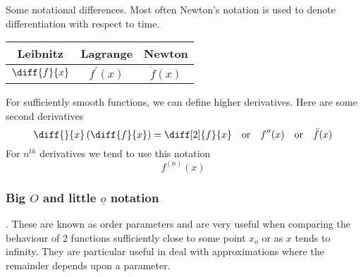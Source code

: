 \documentclass{article}
\begin{document}
Some notational differences. Most often Newton's notation is used to denote differentiation with respect to time. 
\begin{center}
    \begin{tabular}{ c|c|c }    
        Leibnitz & Lagrange & Newton \\
        \midrule
        $\diff{f}{x}$ & $f^{\prime}(x)$ & $\dot{f}(x)$
    \end{tabular}
\end{center}

For sufficiently smooth functions, we can define higher derivatives. Here are some second derivatives
\[
    \diff{}{x}\left(\diff{f}{x}\right) = \diff[2]{f}{x} \quad \text{or} \quad f^{\prime\prime}(x) \quad \text{or} \quad \ddot{f}(x)
\]
For $n^{th}$ derivatives we tend to use this notation
\[
    f^{(n)}(x)
\]

\subsubsection{Big $O$ and little $\underline{o}$ notation}.
These are known as order parameters and are very useful when comparing the behaviour of 2 functions sufficiently close to some point $x_o$ or as $x$ tends to infinity. They are particular useful in deal with approximations where the remainder depends upon a parameter.
\end{document}
